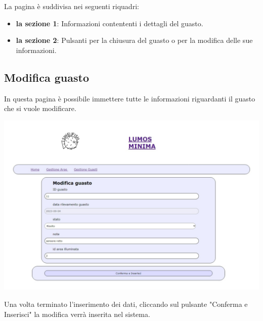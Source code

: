 \documentclass[9pt]{article}
\begin{document}
La pagina è suddivisa nei seguenti riquadri:
\begin{itemize}
	\item \textbf{la sezione 1}: Informazioni contententi i dettagli del guasto.
	\item \textbf{la sezione 2}: Pulsanti per la chiusura del guasto o per la modifica delle sue informazioni.
\end{itemize}

\subsection{Modifica guasto}
In questa pagina è possibile immettere tutte le informazioni riguardanti il guasto che si vuole modificare.

\begin{center}
	\includegraphics[scale=0.3]{Modifica_guasto.png}
\end{center}

Una volta terminato l'inserimento dei dati, cliccando sul pulsante "Conferma e Inserisci"
la modifica verrà inserita nel sistema.
\end{document}
